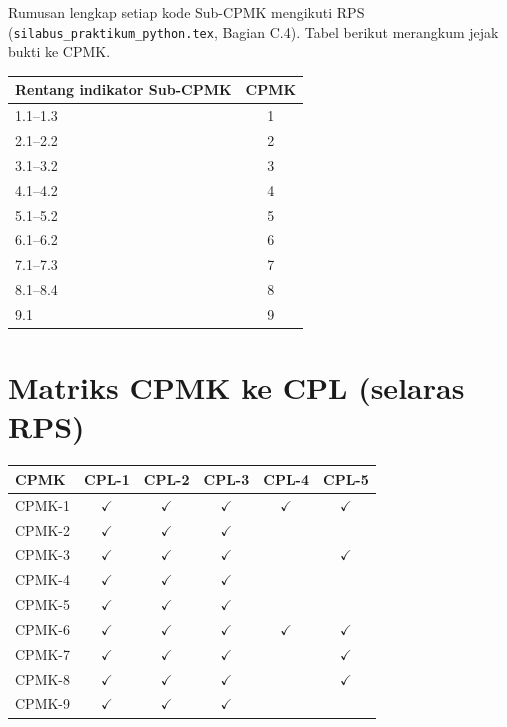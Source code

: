 \documentclass[../main.tex]{subfiles}
\begin{document}
{\small
\noindent Rumusan lengkap setiap kode Sub-CPMK mengikuti RPS (\texttt{silabus\_praktikum\_python.tex}, Bagian C.4). Tabel berikut merangkum jejak bukti ke CPMK.

\begin{tabular}{|p{9.6cm}|c|}
\hline
\textbf{Rentang indikator Sub-CPMK} & \textbf{CPMK} \\
\hline
1.1--1.3 & 1 \\
\hline
2.1--2.2 & 2 \\
\hline
3.1--3.2 & 3 \\
\hline
4.1--4.2 & 4 \\
\hline
5.1--5.2 & 5 \\
\hline
6.1--6.2 & 6 \\
\hline
7.1--7.3 & 7 \\
\hline
8.1--8.4 & 8 \\
\hline
9.1 & 9 \\
\hline
\end{tabular}
}

\section{Matriks CPMK ke CPL (selaras RPS)}

{\footnotesize
\begin{tabular}{|l|c|c|c|c|c|}
\hline
\textbf{CPMK} & \textbf{CPL-1} & \textbf{CPL-2} & \textbf{CPL-3} & \textbf{CPL-4} & \textbf{CPL-5} \\
\hline
CPMK-1 & $\checkmark$ & $\checkmark$ & $\checkmark$ & $\checkmark$ & $\checkmark$ \\
\hline
CPMK-2 & $\checkmark$ & $\checkmark$ & $\checkmark$ & & \\
\hline
CPMK-3 & $\checkmark$ & $\checkmark$ & $\checkmark$ & & $\checkmark$ \\
\hline
CPMK-4 & $\checkmark$ & $\checkmark$ & $\checkmark$ & & \\
\hline
CPMK-5 & $\checkmark$ & $\checkmark$ & $\checkmark$ & & \\
\hline
CPMK-6 & $\checkmark$ & $\checkmark$ & $\checkmark$ & $\checkmark$ & $\checkmark$ \\
\hline
CPMK-7 & $\checkmark$ & $\checkmark$ & $\checkmark$ & & $\checkmark$ \\
\hline
CPMK-8 & $\checkmark$ & $\checkmark$ & $\checkmark$ & & $\checkmark$ \\
\hline
CPMK-9 & $\checkmark$ & $\checkmark$ & $\checkmark$ & & \\
\hline
\end{tabular}
}
\end{document}
